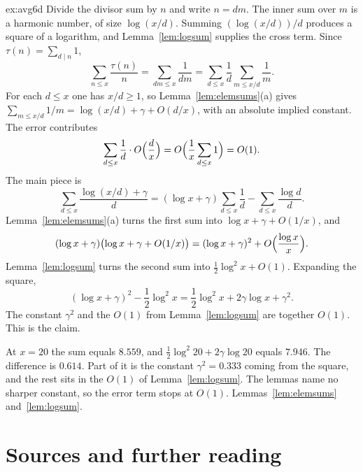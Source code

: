 \begin{solution}{ex:avg6d}
\idea Divide the divisor sum by $n$ and write $n=dm$. The inner sum over $m$ is a harmonic number, of size $\log(x/d)$. Summing $(\log(x/d))/d$ produces a square of a logarithm, and Lemma~\ref{lem:logsum} supplies the cross term.
\writeup Since $\tau(n)=\sum_{d\mid n}1$,
\[
\sum_{n\le x}\frac{\tau(n)}n=\sum_{dm\le x}\frac1{dm}=\sum_{d\le x}\frac1d\sum_{m\le x/d}\frac1m.
\]
For each $d\le x$ one has $x/d\ge1$, so Lemma~\ref{lem:elemsums}(a) gives $\sum_{m\le x/d}1/m=\log(x/d)+\gamma+O(d/x)$, with an absolute implied constant. The error contributes
\[
\sum_{d\le x}\frac1d\cdot O\Bigl(\frac dx\Bigr)=O\Bigl(\frac1x\sum_{d\le x}1\Bigr)=O(1).
\]
The main piece is
\[
\sum_{d\le x}\frac{\log(x/d)+\gamma}d=(\log x+\gamma)\sum_{d\le x}\frac1d-\sum_{d\le x}\frac{\log d}d.
\]
Lemma~\ref{lem:elemsums}(a) turns the first sum into $\log x+\gamma+O(1/x)$, and
\[
(\log x+\gamma)\bigl(\log x+\gamma+O(1/x)\bigr)=(\log x+\gamma)^2+O\Bigl(\frac{\log x}x\Bigr).
\]
Lemma~\ref{lem:logsum} turns the second sum into $\frac12\log^2 x+O(1)$. Expanding the square,
\[
(\log x+\gamma)^2-\frac12\log^2 x=\frac12\log^2 x+2\gamma\log x+\gamma^2.
\]
The constant $\gamma^2$ and the $O(1)$ from Lemma~\ref{lem:logsum} are together $O(1)$. This is the claim.

At $x=20$ the sum equals $8.559$, and $\frac12\log^2 20+2\gamma\log20$ equals $7.946$. The difference is $0.614$. Part of it is the constant $\gamma^2=0.333$ coming from the square, and the rest sits in the $O(1)$ of Lemma~\ref{lem:logsum}. The lemmas name no sharper constant, so the error term stops at $O(1)$.
\tools Lemmas~\ref{lem:elemsums} and~\ref{lem:logsum}.
\end{solution}

\section*{Sources and further reading}

